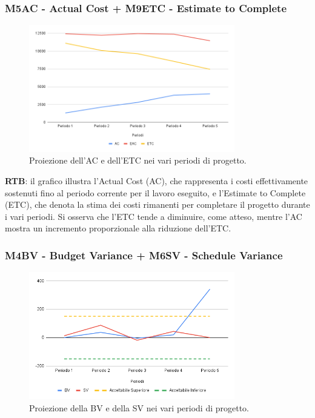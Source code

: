 \subsubsection{M5AC - Actual Cost + M9ETC - Estimate to Complete}
\begin{figure}[H]
    \centering
    \includegraphics[width=0.8\textwidth]{../Images/PianoDiQualifica/AC_ETC.png}
    \caption{Proiezione dell’AC e dell’ETC nei vari periodi di progetto.}
    \label{fig:4}
\end{figure}

\textbf{RTB}: il grafico illustra l'Actual Cost (AC), che rappresenta i costi effettivamente sostenuti fino al periodo corrente per il lavoro eseguito, e l'Estimate to Complete (ETC), che denota la stima dei costi rimanenti per completare il progetto durante i vari periodi. Si osserva che l'ETC tende a diminuire, come atteso, mentre l'AC mostra un incremento proporzionale alla riduzione dell'ETC.

\subsubsection{M4BV - Budget Variance + M6SV - Schedule Variance}
\begin{figure}[H]
    \centering
    \includegraphics[width=0.8\textwidth]{../Images/PianoDiQualifica/BV_SV.png}
    \caption{Proiezione della BV e della SV nei vari periodi di progetto.}
    \label{fig:5}
\end{figure}

